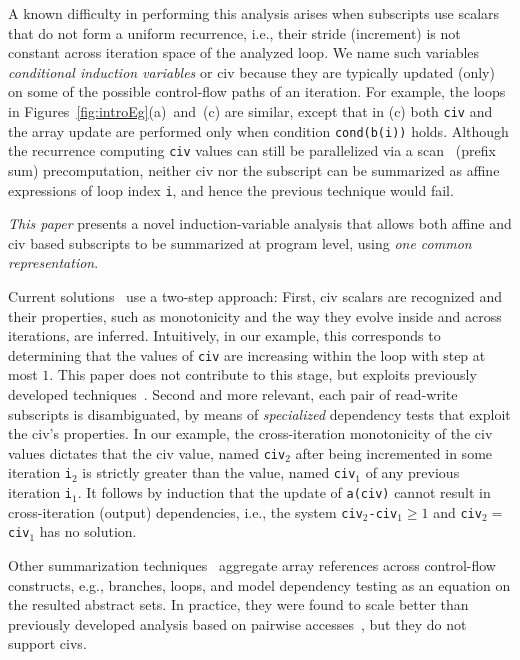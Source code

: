 \documentclass[10pt,nocopyrightspace]{sigplanconf}
\begin{document}
A known difficulty in performing this analysis arises when
subscripts use scalars that do not form a uniform recurrence,
i.e., their stride (increment) is not constant across iteration space of 
the analyzed loop. 
We name  such variables 
{\em conditional induction variables} or {\sc civ} 
because they are typically updated  (only) on some of 
the possible control-flow paths of an iteration.
%
For example, the loops in Figures~\ref{fig:introEg}(a)~and~(c) are 
similar, except that in (c) both {\tt civ} and the array update are 
performed only when condition {\tt cond(b(i))} holds.  
Although the recurrence computing {\tt civ} values can still 
be parallelized via a scan~\cite{segScan} (prefix sum) precomputation, 
neither {\sc civ} nor the subscript can be summarized as affine 
expressions of loop index {\tt i}, and hence the previous technique 
would fail.  
 
{\em This paper} presents a novel induction-variable analysis that allows
both affine and {\sc civ} based subscripts to be summarized at program level,
using {\em one common representation}.

Current solutions~\cite{Blume94RangeTest,SeqVars,VEG,PaduaDemDrInterproc,CohenBeyondMon}
use a two-step approach:
First, {\sc civ} scalars are recognized and their properties, such as 
monotonicity and the way they evolve inside and across iterations, are inferred.   
Intuitively, in our example, this corresponds to determining that 
the values of {\tt civ} are increasing within the loop with step 
at most $1$.
This paper does not contribute to this stage, but  
exploits previously developed techniques~\cite{VEG}.
%
Second and more relevant, each pair of read-write subscripts is
disambiguated, by means of {\em specialized} dependency tests that exploit the
{\sc civ}'s properties. 
In our example, the cross-iteration monotonicity of the {\sc civ} values 
dictates that the {\sc civ} value, named {\tt civ$_2$} after being incremented 
in some iteration {\tt i$_2$} is strictly greater than the value,
named {\tt civ$_1$} of any previous iteration {\tt i$_1$}.
It follows by induction that the update of {\tt a(civ)}
cannot result in cross-iteration (output) dependencies, i.e.,
the system {\tt civ$_2$-civ$_1 \geq 1$} and {\tt civ$_2 = $civ$_1$}
has no solution. 

Other summarization techniques~\cite{SUIF,LMAD,CosPLDI} aggregate 
array references across control-flow constructs, e.g., branches, loops, and  
model dependency testing as an equation on the resulted abstract sets.
In practice, they were found to scale better than previously developed
analysis based on pairwise accesses~\cite{SUIF}, 
but they do not support {\sc civ}s.
\end{document}
